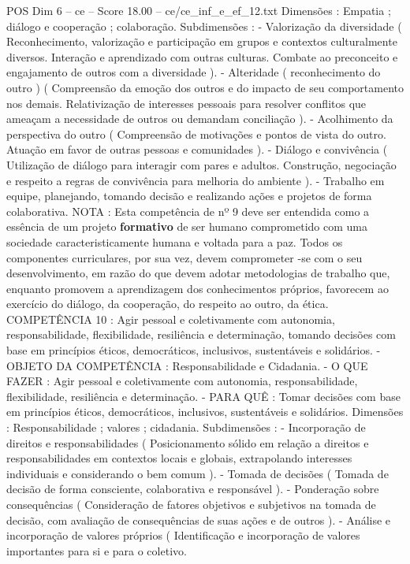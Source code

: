 \begin{textsample}{POS Dim 6 – ce – Score 18.00 – ce/ce\_inf\_e\_ef\_12.txt}
Dimensões : Empatia ; diálogo e cooperação ; colaboração.
Subdimensões : - Valorização da diversidade ( Reconhecimento, valorização e participação em grupos e contextos culturalmente diversos.
Interação e aprendizado com outras culturas.
Combate ao preconceito e engajamento de outros com a diversidade ). - Alteridade ( reconhecimento do outro ) ( Compreensão da emoção dos outros e do impacto de seu comportamento nos demais.
Relativização de interesses pessoais para resolver conflitos que ameaçam a necessidade de outros ou demandam conciliação ). - Acolhimento da perspectiva do outro ( Compreensão de motivações e pontos de vista do outro.
Atuação em favor de outras pessoas e comunidades ). - Diálogo e convivência ( Utilização de diálogo para interagir com pares e adultos.
Construção, negociação e respeito a regras de convivência para melhoria do ambiente ). - Trabalho em equipe, planejando, tomando decisão e realizando ações e projetos de forma colaborativa.
NOTA : Esta competência de nº 9 deve ser entendida como a essência de um projeto \textbf{formativo} de ser humano comprometido com uma sociedade caracteristicamente humana e voltada para a paz.
Todos os componentes curriculares, por sua vez, devem comprometer -se com o seu desenvolvimento, em razão do que devem adotar metodologias de trabalho que, enquanto promovem a aprendizagem dos conhecimentos próprios, favorecem ao exercício do diálogo, da cooperação, do respeito ao outro, da ética.
COMPETÊNCIA 10 : Agir pessoal e coletivamente com autonomia, responsabilidade, flexibilidade, resiliência e determinação, tomando decisões com base em princípios éticos, democráticos, inclusivos, sustentáveis e solidários. - OBJETO DA COMPETÊNCIA : Responsabilidade e Cidadania. - O QUE FAZER : Agir pessoal e coletivamente com autonomia, responsabilidade, flexibilidade, resiliência e determinação. - PARA QUÊ : Tomar decisões com base em princípios éticos, democráticos, inclusivos, sustentáveis e solidários.
Dimensões : Responsabilidade ; valores ; cidadania.
Subdimensões : - Incorporação de direitos e responsabilidades ( Posicionamento sólido em relação a direitos e responsabilidades em contextos locais e globais, extrapolando interesses individuais e considerando o bem comum ). - Tomada de decisões ( Tomada de decisão de forma consciente, colaborativa e responsável ). - Ponderação sobre consequências ( Consideração de fatores objetivos e subjetivos na tomada de decisão, com avaliação de consequências de suas ações e de outros ). - Análise e incorporação de valores próprios ( Identificação e incorporação de valores importantes para si e para o coletivo.

\end{textsample}
